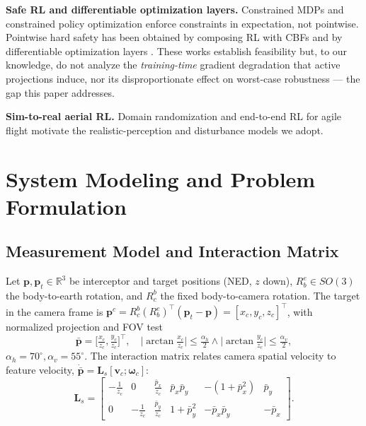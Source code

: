 \documentclass[journal]{IEEEtran}
\newcommand{\Rbe}{R_b^e}
\begin{document}
\textbf{Safe RL and differentiable optimization layers.} Constrained MDPs
\cite{altman1999cmdp} and constrained policy optimization \cite{achiam2017cpo}
enforce constraints in expectation, not pointwise. Pointwise hard safety has
been obtained by composing RL with CBFs \cite{cheng2019endtoend} and by
differentiable optimization layers \cite{amos2017optnet,donti2021dc3}. These
works establish feasibility but, to our knowledge, do not analyze the
\emph{training-time} gradient degradation that active projections induce, nor
its disproportionate effect on worst-case robustness --- the gap this paper
addresses.

\textbf{Sim-to-real aerial RL.} Domain randomization \cite{tobin2017domain}
and end-to-end RL for agile flight \cite{kaufmann2023champion} motivate the
realistic-perception and disturbance models we adopt.

\section{System Modeling and Problem Formulation}
\subsection{Measurement Model and Interaction Matrix}
Let $\mathbf p,\mathbf p_t\in\mathbb R^3$ be interceptor and target positions
(NED, $z$ down), $\Rbe\in SO(3)$ the body-to-earth rotation, and $R_c^b$ the
fixed body-to-camera rotation. The target in the camera frame is
$\mathbf p^c=R_c^b(\Rbe)^\top(\mathbf p_t-\mathbf p)=[x_c,y_c,z_c]^\top$, with
normalized projection and FOV test
\begin{equation}
\bar{\mathbf p}=\Big[\tfrac{x_c}{z_c},\tfrac{y_c}{z_c}\Big]^\top,\quad
\Big|\arctan\tfrac{x_c}{z_c}\Big|\!\le\!\tfrac{\alpha_h}{2}\wedge
\Big|\arctan\tfrac{y_c}{z_c}\Big|\!\le\!\tfrac{\alpha_v}{2},
\label{eq:fov}
\end{equation}
$\alpha_h=70^\circ,\alpha_v=55^\circ$. The interaction matrix relates camera
spatial velocity to feature velocity, $\dot{\bar{\mathbf p}}=
\mathbf L_s[\mathbf v_c;\bm\omega_c]$:
\begin{equation}
\mathbf L_s\!=\!\begin{bmatrix}
-\tfrac{1}{z_c}&0&\tfrac{\bar p_x}{z_c}&\bar p_x\bar p_y&-(1{+}\bar p_x^2)&\bar p_y\\
0&-\tfrac{1}{z_c}&\tfrac{\bar p_y}{z_c}&1{+}\bar p_y^2&-\bar p_x\bar p_y&-\bar p_x
\end{bmatrix}.
\label{eq:Ls}
\end{equation}
\end{document}

